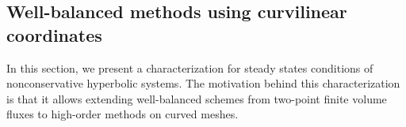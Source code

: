 \documentclass[]{scrartcl}
\newcommand*{\ldblbrace}{\{\mskip-5mu \left \{}
\newcommand*{\rdblbrace}{ \}\mskip-5mu \right \}}
\newcommand{\mean}[1]{\left\ldblbrace #1 \right\rdblbrace}
\newcommand{\vecs}[1]{\underline{#1}}
\newcommand{\imtx}[1]{\smash{\underline{\underline{#1}}}}
\newcommand{\mtxs}[1]{\underline{\underline{#1}}}
\newcommand{\jump}[1]{\left\llbracket #1  \right\rrbracket}
\theoremstyle{definition}
\begin{document}

\subsection{Well-balanced methods using curvilinear coordinates}
\label{sec:wb_curvilinear}
In this section, we present a characterization for steady states conditions of nonconservative hyperbolic systems. The motivation behind this characterization is that it allows extending well-balanced schemes from two-point finite volume fluxes to high-order methods on curved meshes.
\end{document}
